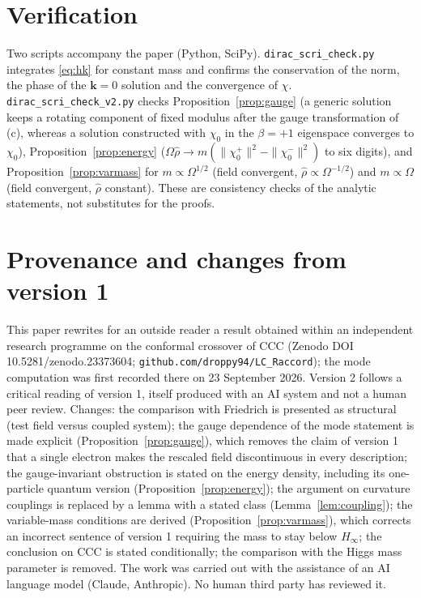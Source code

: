 \documentclass[11pt,a4paper]{article}
\theoremstyle{definition}
\begin{document}
\section*{Verification}
Two scripts accompany the paper (Python, SciPy). \texttt{dirac\_scri\_check.py} integrates \eqref{eq:hk} for constant mass and confirms the conservation of the norm, the phase of the $\mathbf{k}=0$ solution and the convergence of $\chi$. \texttt{dirac\_scri\_check\_v2.py} checks Proposition~\ref{prop:gauge} (a generic solution keeps a rotating component of fixed modulus after the gauge transformation of (c), whereas a solution constructed with $\chi_{0}$ in the $\beta=+1$ eigenspace converges to $\chi_{0}$), Proposition~\ref{prop:energy} ($\Omega\hat\rho\to m(\|\chi_{0}^{+}\|^{2}-\|\chi_{0}^{-}\|^{2})$ to six digits), and Proposition~\ref{prop:varmass} for $m\propto\Omega^{1/2}$ (field convergent, $\hat\rho\propto\Omega^{-1/2}$) and $m\propto\Omega$ (field convergent, $\hat\rho$ constant). These are consistency checks of the analytic statements, not substitutes for the proofs.

\section*{Provenance and changes from version 1}
This paper rewrites for an outside reader a result obtained within an independent research programme on the conformal crossover of CCC (Zenodo DOI 10.5281/zenodo.23373604; \texttt{github.com/droppy94/LC\_Raccord}); the mode computation was first recorded there on 23 September 2026. Version 2 follows a critical reading of version 1, itself produced with an AI system and not a human peer review. Changes: the comparison with Friedrich is presented as structural (test field versus coupled system); the gauge dependence of the mode statement is made explicit (Proposition~\ref{prop:gauge}), which removes the claim of version 1 that a single electron makes the rescaled field discontinuous in every description; the gauge-invariant obstruction is stated on the energy density, including its one-particle quantum version (Proposition~\ref{prop:energy}); the argument on curvature couplings is replaced by a lemma with a stated class (Lemma~\ref{lem:coupling}); the variable-mass conditions are derived (Proposition~\ref{prop:varmass}), which corrects an incorrect sentence of version 1 requiring the mass to stay below $H_{\infty}$; the conclusion on CCC is stated conditionally; the comparison with the Higgs mass parameter is removed. The work was carried out with the assistance of an AI language model (Claude, Anthropic). No human third party has reviewed it.
\end{document}

